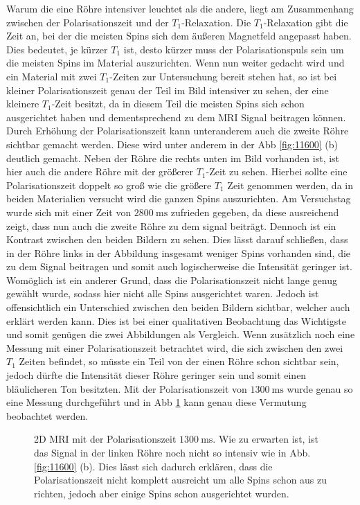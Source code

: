 Warum die eine Röhre intensiver leuchtet als die andere, liegt am Zusammenhang zwischen der Polarisationszeit und der $T_1$-Relaxation. Die $T_1$-Relaxation gibt die Zeit an, bei der die meisten Spins sich dem äußeren Magnetfeld angepasst haben. Dies bedeutet, je kürzer $T_1$ ist, desto kürzer muss der Polarisationspuls sein um die meisten Spins im Material auszurichten. Wenn nun weiter gedacht wird und ein Material mit zwei $T_1$-Zeiten zur Untersuchung bereit stehen hat, so ist bei kleiner Polarisationszeit genau der Teil im Bild intensiver zu sehen, der eine kleinere $T_1$-Zeit besitzt, da in diesem Teil die meisten Spins sich schon ausgerichtet haben und dementsprechend zu dem MRI Signal beitragen können.\\
Durch Erhöhung der Polarisationszeit kann unteranderem auch die zweite Röhre sichtbar gemacht werden. Diese wird unter anderem in der Abb \ref{fig:11600} (b)  deutlich gemacht. Neben der Röhre die rechts unten im Bild vorhanden ist, ist hier auch die andere Röhre mit der größerer $T_1$-Zeit zu sehen. Hierbei sollte eine Polarisationszeit doppelt so groß wie die größere $T_1$ Zeit genommen werden, da in beiden Materialien versucht wird die ganzen Spins auszurichten. Am Versuchstag wurde sich mit einer Zeit von $\SI{2800}{\milli\second}$ zufrieden gegeben, da diese ausreichend zeigt, dass nun auch die zweite Röhre zu dem signal beiträgt. Dennoch ist ein Kontrast zwischen den beiden Bildern zu sehen. Dies lässt darauf schließen, dass in der Röhre links in der Abbildung insgesamt weniger Spins vorhanden sind, die zu dem Signal beitragen und somit auch logischerweise die Intensität geringer ist. Womöglich ist ein anderer Grund, dass die Polarisationszeit nicht lange genug gewählt wurde, sodass hier nicht alle Spins ausgerichtet waren. Jedoch ist offensichtlich ein Unterschied zwischen den beiden Bildern sichtbar, welcher auch erklärt werden kann. Dies ist bei einer qualitativen Beobachtung das Wichtigste und somit genügen die zwei Abbildungen als Vergleich. Wenn zusätzlich noch eine Messung mit einer Polarisationszeit betrachtet wird, die sich zwischen den zwei $T_1$ Zeiten befindet, so müsste ein Teil von der einen Röhre schon sichtbar sein, jedoch dürfte die Intensität dieser Röhre geringer sein und somit einen bläulicheren Ton besitzten. Mit der Polarisationszeit von $\SI{1300}{\milli\second}$ wurde genau so eine Messung durchgeführt und in Abb \ref{fig: 1300} kann genau diese Vermutung beobachtet werden.
    \begin{figure}[H]
        \centering
        
        \caption[2D MRI mit der Polarisationszeit $\SI{1300}{\milli\second}$]{2D MRI mit der Polarisationszeit $\SI{1300}{\milli\second}$. Wie zu erwarten ist, ist das Signal in der linken Röhre noch nicht so intensiv wie in Abb. \ref{fig:11600} (b). Dies lässt sich dadurch erklären, dass die Polarisationszeit nicht komplett ausreicht um alle Spins schon aus zu richten, jedoch aber einige Spins schon ausgerichtet wurden.}
        \label{fig: 1300}
    \end{figure}
